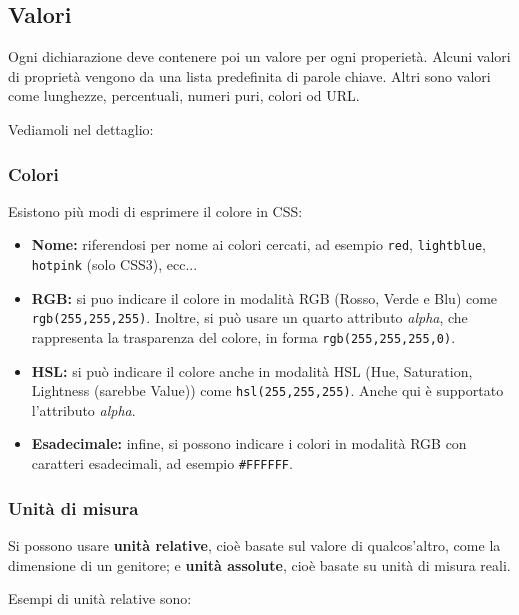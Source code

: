 \documentclass[a4paper,11pt]{article}
\begin{document}
\subsection{Valori}
Ogni dichiarazione deve contenere poi un valore per ogni properietà.
Alcuni valori di proprietà vengono da una lista predefinita di parole chiave.
Altri sono valori come lunghezze, percentuali, numeri puri, colori od URL.

Vediamoli nel dettaglio:

\subsubsection{Colori}
Esistono più modi di esprimere il colore in CSS:
\begin{itemize}
	\item \textbf{Nome:} riferendosi per nome ai colori cercati, ad esempio \lstinline|red|, \lstinline|lightblue|, \lstinline|hotpink| (solo CSS3), ecc...
	\item \textbf{RGB:} si puo indicare il colore in modalità RGB (Rosso, Verde e Blu) come \lstinline|rgb(255,255,255)|. Inoltre, si può usare un quarto attributo \textit{alpha}, che rappresenta la trasparenza del colore, in forma \lstinline|rgb(255,255,255,0)|.
	\item \textbf{HSL:} si può indicare il colore anche in modalità HSL (Hue, Saturation, Lightness (sarebbe Value)) come \lstinline|hsl(255,255,255)|. Anche qui è supportato l'attributo \textit{alpha}.
	\item \textbf{Esadecimale:} infine, si possono indicare i colori in modalità RGB con caratteri esadecimali, ad esempio \lstinline|#FFFFFF|.
\end{itemize}

\subsubsection{Unità di misura}
Si possono usare \textbf{unità relative}, cioè basate sul valore  di qualcos'altro, come la dimensione di un genitore; e \textbf{unità assolute}, cioè basate su unità di misura reali.

Esempi di unità relative sono:
\end{document}
